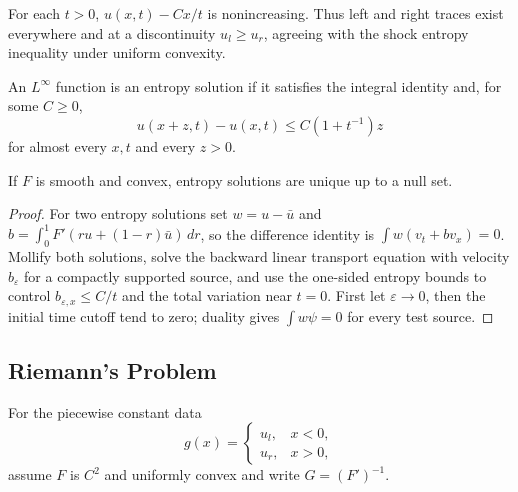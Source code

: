 \begin{remark}
\label{rem:entropy-condition-consequences}
For each $t>0$, $u(x,t)-Cx/t$ is nonincreasing. Thus left and right traces
exist everywhere and at a discontinuity $u_l\ge u_r$, agreeing with the shock
entropy inequality under uniform convexity.
\end{remark}

\begin{definition}
\label{def:entropy-solution-conservation-law}
An $L^\infty$ function is an entropy solution if it satisfies the integral
identity and, for some $C\ge0$,
\[
u(x+z,t)-u(x,t)\le C(1+t^{-1})z
\]
for almost every $x,t$ and every $z>0$.
\end{definition}

\begin{theorem}
\label{thm:uniqueness-entropy-solutions}
If $F$ is smooth and convex, entropy solutions are unique up to a null set.
\end{theorem}

\begin{proof}
\sketch For two entropy solutions set $w=u-\bar u$ and
$b=\int_0^1F'(ru+(1-r)\bar u)\,dr$, so the difference identity is
$\int w(v_t+bv_x)=0$. Mollify both solutions, solve the backward linear
transport equation with velocity $b_\varepsilon$ for a compactly supported
source, and use the one-sided entropy bounds to control
$b_{\varepsilon,x}\le C/t$ and the total variation near $t=0$. First let
$\varepsilon\to0$, then the initial time cutoff tend to zero; duality gives
$\int w\psi=0$ for every test source.
\end{proof}

\subsection{Riemann's Problem}
\label{sec:riemann-problem}

For the piecewise constant data
\[
g(x)=\begin{cases}u_l,&x<0,\\u_r,&x>0,\end{cases}
\]
assume $F$ is $C^2$ and uniformly convex and write $G=(F')^{-1}$.


